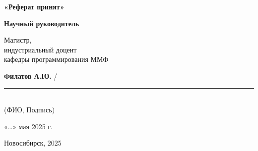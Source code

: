 \hspace*{\fill} %
\begin{minipage}[t]{0.5\textwidth}
  \textbf{«Реферат принят»}
  
  \vspace{0.5cm} %
  
  \textbf{Научный руководитель}
  
  \vspace{0.5cm} %
  
  Магистр, \\
  индустриальный доцент \\
  кафедры программирования ММФ
  
  \vspace{1cm} %
  \textbf{Филатов А.Ю.} / \rule{4cm}{0.4pt} \\ %
  \small (ФИО, Подпись) %

  \vspace{1cm} %

  «\ldots» мая 2025 г. %
\end{minipage}

\vfill %

\begin{center}
Новосибирск, 2025
\end{center}
